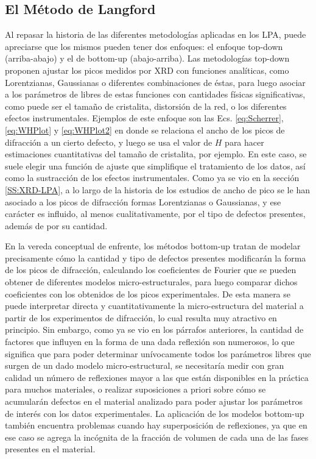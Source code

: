 \subsection{El Método de Langford}\label{SS:Langford}
Al repasar la historia de las diferentes metodologías aplicadas en los LPA, puede apreciarse que los mismos pueden tener dos enfoques: el enfoque top-down (arriba-abajo) y el de bottom-up (abajo-arriba).
Las metodologías top-down proponen ajustar los picos medidos por XRD con funciones analíticas, como Lorentzianas, Gaussianas o diferentes combinaciones de éstas, para luego asociar a los parámetros de libres de estas funciones con cantidades físicas significativas, como puede ser el tamaño de cristalita, distorsión de la red, o los diferentes efectos instrumentales.
Ejemplos de este enfoque son las Ecs. \ref{eq:Scherrer}, \ref{eq:WHPlot} y \ref{eq:WHPlot2} en donde se relaciona el ancho de los picos de difracción a un cierto defecto, y luego se usa el valor de $H$ para hacer estimaciones cuantitativas del tamaño de cristalita, por ejemplo.
En este caso, se suele elegir una función de ajuste que simplifique el tratamiento de los datos, así como la sustracción de los efectos instrumentales.
Como ya se vio en la sección \ref{SS:XRD-LPA}, a lo largo de la historia de los estudios de ancho de pico se le han asociado a los picos de difracción formas Lorentzianas o Gaussianas, y ese carácter es influido, al menos cualitativamente, por el tipo de defectos presentes, además de por su cantidad.

En la vereda conceptual de enfrente, los métodos bottom-up tratan de modelar precisamente cómo la cantidad y tipo de defectos presentes modificarán la forma de los picos de difracción, calculando los coeficientes de Fourier que se pueden obtener de diferentes modelos micro-estructurales, para luego comparar dichos coeficientes con los obtenidos de los picos experimentales.
De esta manera se puede interpretar directa y cuantitativamente la micro-estructura del material a partir de los experimentos de difracción, lo cual resulta muy atractivo en principio.
Sin embargo, como ya se vio en los párrafos anteriores, la cantidad de factores que influyen en la forma de una dada reflexión son numerosos, lo que significa que para poder determinar unívocamente todos los parámetros libres que surgen de un dado modelo micro-estructural, se necesitaría medir con gran calidad un número de reflexiones mayor a las que están disponibles en la práctica para muchos materiales, o realizar suposiciones a priori sobre cómo se acumularán defectos en el material analizado para poder ajustar los parámetros de interés con los datos experimentales.
La aplicación de los modelos bottom-up también encuentra problemas cuando hay superposición de reflexiones, ya que en ese caso se agrega la incógnita de la fracción de volumen de cada una de las fases presentes en el material.

